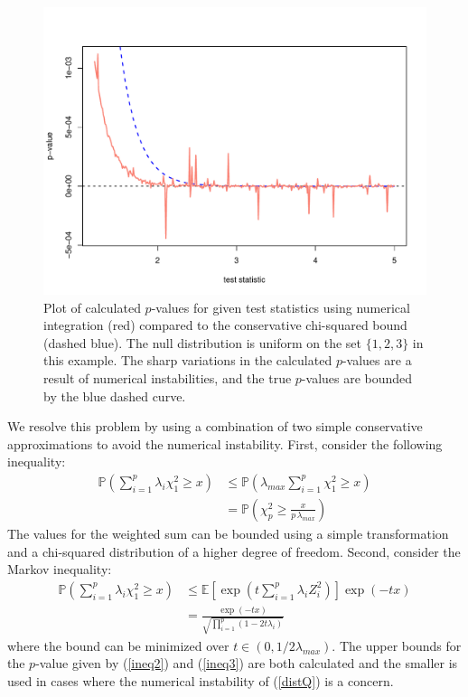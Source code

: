\begin{figure}
\begin{center}
\includegraphics[scale=0.4]{fig1.pdf}
\end{center}
\caption{Plot of calculated $p$-values for given test statistics
using numerical integration
(red) compared to the conservative chi-squared bound (dashed blue). 
The null distribution is uniform on the set $\{1,2,3\}$ in this example.
The sharp variations in the calculated $p$-values are a result of numerical
instabilities, and the true $p$-values are bounded by the blue dashed curve.}
\label{cvmissues}
\end{figure}

We resolve this problem by using a combination of
two simple conservative approximations to
avoid the numerical instability. First, consider the
following inequality:
\begin{align}
\mathbb{P} \left(\sum_{i=1}^{p} \lambda_i \chi^2_1 \geq x \right) &\leq \mathbb{P} \left( \lambda_{max} \sum_{i=1}^{p} \chi^2_1 \geq x \right) \label{ineq1} \\
&= \mathbb{P} \left(\chi^2_p \geq \frac{x}{p \, \lambda_{max}} \right)
\label{ineq2}
\end{align}
The values for the weighted sum can be bounded using a simple transformation
and a chi-squared distribution of a higher degree of freedom.  Second,
consider the Markov inequality: 
\begin{align}
\mathbb{P} \left(\sum_{i=1}^{p} \lambda_i \chi^2_1 \geq x \right) &\leq \mathbb{E}
  \left[\exp\left(t\sum_{i=1}^{p}\lambda_iZ_i^2\right)\right]\exp(-tx) \\
&= \frac{\exp(-tx)}{\sqrt{\prod_{i=1}^{p}(1-2t\lambda_i)}}
\label{ineq3}
\end{align}
where the bound can be
minimized over $t \in (0,1/2\lambda_{max})$.
The upper bounds for the $p$-value given by (\ref{ineq2}) and (\ref{ineq3})
are both calculated and the smaller is used in cases where the numerical
instability of (\ref{distQ}) is a concern.

